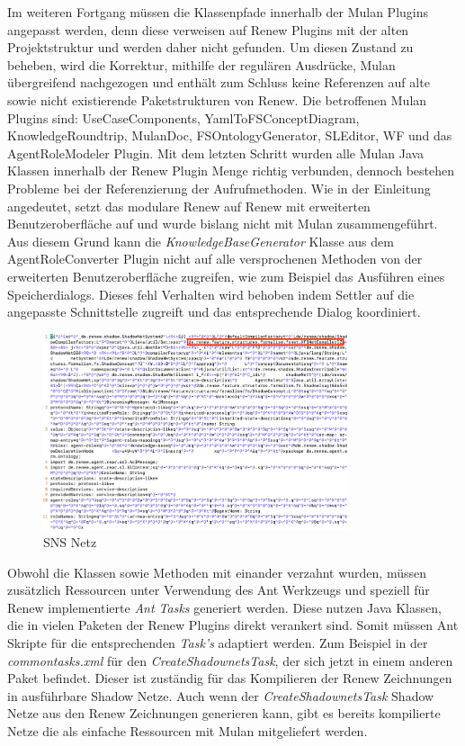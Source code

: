 	Im weiteren Fortgang müssen die Klassenpfade innerhalb der Mulan Plugins angepasst werden, denn diese verweisen auf Renew Plugins mit der alten Projektstruktur und werden daher nicht gefunden. Um diesen Zustand zu beheben, wird die Korrektur, mithilfe der regulären Ausdrücke, Mulan übergreifend nachgezogen und enthält zum Schluss keine Referenzen auf alte sowie nicht existierende Paketstrukturen von Renew. Die betroffenen Mulan Plugins sind: UseCaseComponents, YamlToFSConceptDiagram, KnowledgeRoundtrip, MulanDoc, FSOntologyGenerator, SLEditor, WF und das AgentRoleModeler Plugin. \newline
	Mit dem letzten Schritt wurden alle Mulan Java Klassen innerhalb der Renew Plugin Menge richtig verbunden, dennoch bestehen Probleme bei der Referenzierung der Aufrufmethoden. Wie in der Einleitung angedeutet, setzt das modulare Renew auf Renew mit erweiterten Benutzeroberfläche auf und wurde bislang nicht mit Mulan zusammengeführt. Aus diesem Grund kann die \textit{KnowledgeBaseGenerator} Klasse aus dem AgentRoleConverter Plugin nicht auf alle versprochenen Methoden von der erweiterten Benutzeroberfläche zugreifen, wie zum Beispiel das Ausführen eines Speicherdialogs. Dieses fehl Verhalten wird behoben indem Settler auf die angepasste Schnittstelle zugreift und das entsprechende Dialog koordiniert. \bigbreak
	\begin{figure}[h!]
	  \centering
	  \includegraphics[width=0.8\textwidth]{material/images/shadownet.png}
	  \caption{SNS Netz}
	  \label{fig:sns_netz}
	\end{figure}
	Obwohl die Klassen sowie Methoden mit einander verzahnt wurden, müssen zusätzlich Ressourcen unter Verwendung des Ant Werkzeugs und speziell für Renew implementierte \textit{Ant Tasks} generiert werden. Diese nutzen Java Klassen, die in vielen Paketen der Renew Plugins direkt verankert sind. Somit müssen Ant Skripte für die entsprechenden \textit{Task's} adaptiert werden. Zum Beispiel in der \textit{commontasks.xml} für den \textit{CreateShadownetsTask}, der sich jetzt in einem anderen Paket befindet. Dieser ist zuständig für das Kompilieren der Renew Zeichnungen in ausführbare Shadow Netze. Auch wenn der \textit{CreateShadownetsTask} Shadow Netze aus den Renew Zeichnungen generieren kann, gibt es bereits kompilierte Netze die als einfache Ressourcen mit Mulan mitgeliefert werden. \newline
